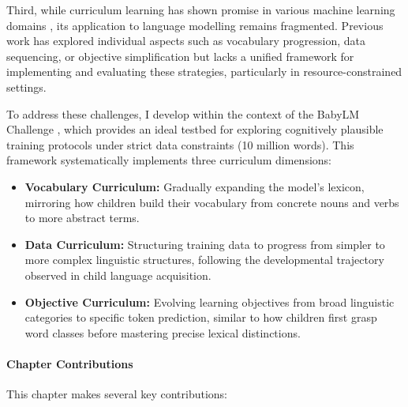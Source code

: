 Third, while curriculum learning has shown promise in various machine learning domains \citep{bengio2009curriculum}, its application to language modelling remains fragmented. Previous work has explored individual aspects such as vocabulary progression, data sequencing, or objective simplification but lacks a unified framework for implementing and evaluating these strategies, particularly in resource-constrained settings.

To address these challenges, I develop \climb within the context of the BabyLM Challenge \citep{warstadt2023babylm1}, which provides an ideal testbed for exploring cognitively plausible training protocols under strict data constraints (10 million words). This framework systematically implements three curriculum dimensions:

\begin{itemize}
    \item \textbf{Vocabulary Curriculum:} Gradually expanding the model's lexicon, mirroring how children build their vocabulary from concrete nouns and verbs to more abstract terms.
    \item \textbf{Data Curriculum:} Structuring training data to progress from simpler to more complex linguistic structures, following the developmental trajectory observed in child language acquisition.
    \item \textbf{Objective Curriculum:} Evolving learning objectives from broad linguistic categories to specific token prediction, similar to how children first grasp word classes before mastering precise lexical distinctions.
\end{itemize}

\paragraph{Chapter Contributions} This chapter makes several key contributions:

